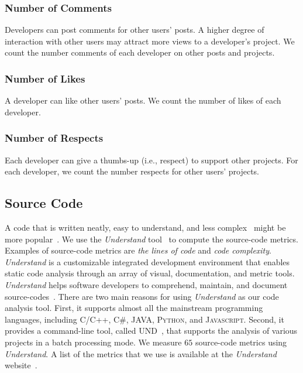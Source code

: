\subsubsection*{Number of Comments}
Developers can post comments for other users' posts. A higher degree of interaction with other users may attract more views to a developer's project.
We count the number comments of each developer on other posts and projects.

\subsubsection*{Number of Likes}
A developer can like other users' posts. We count the number of likes of each developer.

\subsubsection*{Number of Respects}
Each developer can give a thumbs-up (i.e., respect) to support other projects. For each developer, we count the number respects for other users' projects.

\subsection{Source Code}

A code that is written neatly, easy to understand, and less complex~\cite{storey2006theories} might be more popular~\cite{noei2017study}.
We use the \textit{Understand} tool~\cite{understand,understandfeatues} to compute the source-code metrics.
Examples of source-code metrics are \textit{the lines of code} and \textit{code complexity}.
\textit{Understand} is a customizable integrated development environment that enables static code analysis through an array of visual, documentation, and metric tools.
\textit{Understand} helps software developers to comprehend, maintain, and document source-codes~\cite{understand}. There are two main reasons for using \textit{Understand} as our code analysis tool. First, it supports almost all the mainstream programming languages, including \textsc{C/C++}, \textsc{C\#}, \textsc{JAVA}, \textsc{Python}, and \textsc{Javascript}.
Second, it provides a command-line tool, called UND~\cite{understandcmd}, that supports the analysis of various projects in a batch processing mode.
We measure $65$ source-code metrics using \textit{Understand}.
A list of the metrics that we use is available at the \textit{Understand} website~\cite{understandmetrics}.
